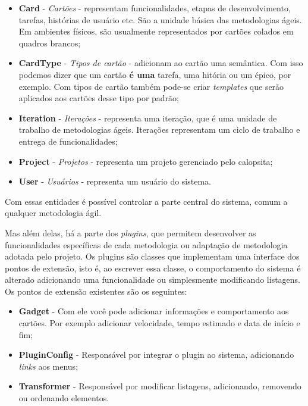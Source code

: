 \begin{itemize}
	\item{\textbf{Card} - \textit{Cartões} - representam funcionalidades, etapas de desenvolvimento, tarefas, histórias de usuário etc. São a unidade básica das metodologias ágeis. Em ambientes físicos, são usualmente representados por cartões colados em quadros brancos;}
	\item{\textbf{CardType} - \textit{Tipos de cartão} - adicionam ao cartão uma semântica. Com isso podemos dizer que um cartão \textbf{é uma} tarefa, uma hitória ou um épico, por exemplo. Com tipos de cartão também pode-se criar \textit{templates} que serão aplicados aos cartões desse tipo por padrão;}
	\item{\textbf{Iteration} - \textit{Iterações} - representa uma iteração, que é uma unidade de trabalho de metodologias ágeis. Iterações representam um ciclo de trabalho e entrega de funcionalidades;}
	\item{\textbf{Project} - \textit{Projetos} - representa um projeto gerenciado pelo calopsita;}
	\item{\textbf{User} - \textit{Usuários} - representa um usuário do sistema.}
\end{itemize}

Com essas entidades é possível controlar a parte central do sistema, comum a qualquer metodologia ágil. 

Mas além delas, há a parte dos \textit{plugins}, que permitem desenvolver as funcionalidades específicas de cada metodologia ou adaptação de metodologia adotada pelo projeto. Os plugins são classes que implementam uma interface dos pontos de extensão, isto é, ao escrever essa classe, o comportamento do sistema é alterado adicionando uma funcionalidade ou simplesmente modificando listagens. Os pontos de extensão existentes são os seguintes:

\begin{itemize}
	\item{\textbf{Gadget} - Com ele você pode adicionar informações e comportamento aos cartões. Por exemplo adicionar velocidade, tempo estimado e data de início e fim;}
	\item{\textbf{PluginConfig} - Responsável por integrar o plugin ao sistema, adicionando \textit{links} aos menus;}
	\item{\textbf{Transformer} - Responsável por modificar listagens, adicionando, removendo ou ordenando elementos.}
\end{itemize}

